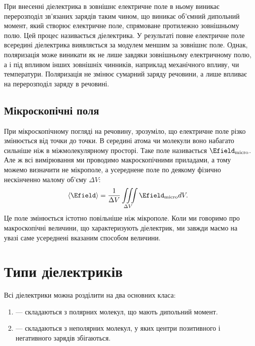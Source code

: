При внесенні діелектрика в зовнішнє електричне поле в ньому виникає перерозподіл зв'язаних зарядів таким чином, що виникає об'ємний дипольний момент,
який створює електричне поле, спрямоване протилежно зовнішньому полю. Цей процес називається  діелектрика. У результаті повне
електричне поле всередині діелектрика виявляється за модулем меншим за зовнішнє поле.
Однак, поляризація може виникати як не лише завдяки зовнішньому електричному полю, а і під впливом інших зовнішніх чинників, наприклад механічного
впливу, чи температури. Поляризація не змінює сумарний заряду речовини, а лише впливає на перерозподіл заряду в речовині.


\subsection*{Мікроскопічні поля}

При мікроскопічному погляді на речовину, зрозуміло, що електричне поле різко змінюється від точки до точки. В середині атома чи молекули воно набагато
сильніше ніж в міжмолекулярному просторі. Таке поле називається  $\Efield_\text{micro}$. Але ж всі вимірювання ми проводимо
макроскопічними приладами, а тому можемо визначити не мікрополе, а усереднене поле по деякому фізично нескінченно малому об'єму $\Delta V$:
\begin{equation*}
	\left\langle \Efield\right\rangle = \frac1{\Delta V} \iiint\limits_{\Delta V}
	\Efield_\text{micro} dV.
\end{equation*}
Це поле змінюється істотно повільніше ніж мікрополе. Коли ми говоримо про макроскопічні величини, що характеризують діелектрик, ми завжди маємо на увазі
саме усереднені вказаним способом величини.


\section{Типи діелектриків}


Всі діелектрики можна розділити на два основних класа:
\begin{enumerate}
    \item {} --- складаються з полярних молекул, що мають дипольний момент.
    \item {} --- складаються з неполярних молекул, у яких центри позитивного і негативного зарядів збігаються.
\end{enumerate}

